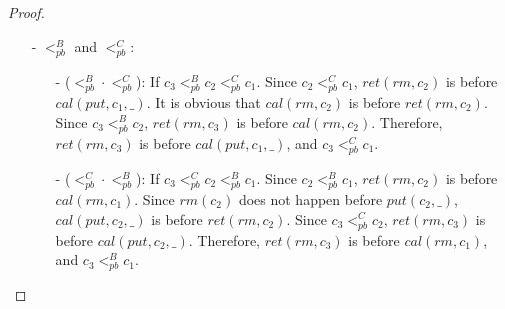 \begin {proof}
\begin{itemize}
\begin{itemize}
    \item[-] ($<_{\textit{pb}}^C \cdot <_{\textit{pb}}^A$): If $c_3 <_{\textit{pb}}^C c_2 <_{\textit{pb}}^A c_1$. Since $c_2 <_{\textit{pb}}^A c_1$, $\textit{ret}(\textit{put},c_2)$ is before $\textit{cal}(\textit{put},c_1,\_)$. It is obvious that $\textit{cal}(\textit{put},c_2,\_)$ is before $\textit{ret}(\textit{put},c_2)$. Since $c_3 <_{\textit{pb}}^C c_2$, $\textit{ret}(\textit{rm},c_3)$ is before $\textit{cal}(\textit{put},c_2,\_)$. Therefore, $\textit{ret}(\textit{rm},c_3)$ is before $\textit{cal}(\textit{put},c_1,\_)$, and $c_3 <_{\textit{pb}}^C c_1$.

    \end{itemize}

\item[-] $<_{\textit{pb}}^B$ and $<_{\textit{pb}}^C$:

    \begin{itemize}
    \setlength{\itemsep}{0.5pt}
    \item[-] ($<_{\textit{pb}}^B \cdot <_{\textit{pb}}^C$): If $c_3 <_{\textit{pb}}^B c_2 <_{\textit{pb}}^C c_1$. Since $c_2 <_{\textit{pb}}^C c_1$, $\textit{ret}(\textit{rm},c_2)$ is before $\textit{cal}(\textit{put},c_1,\_)$. It is obvious that $\textit{cal}(\textit{rm},c_2)$ is before $\textit{ret}(\textit{rm},c_2)$. Since $c_3 <_{\textit{pb}}^B c_2$, $\textit{ret}(\textit{rm},c_3)$ is before $\textit{cal}(\textit{rm},c_2)$. Therefore, $\textit{ret}(\textit{rm},c_3)$ is before $\textit{cal}(\textit{put},c_1,\_)$, and $c_3 <_{\textit{pb}}^C c_1$.

    \item[-] ($<_{\textit{pb}}^C \cdot <_{\textit{pb}}^B$): If $c_3 <_{\textit{pb}}^C c_2 <_{\textit{pb}}^B c_1$. Since $c_2 <_{\textit{pb}}^B c_1$, $\textit{ret}(\textit{rm},c_2)$ is before $\textit{cal}(\textit{rm},c_1)$. Since $\textit{rm}(c_2)$ does not happen before $\textit{put}(c_2,\_)$, $\textit{cal}(\textit{put},c_2,\_)$ is before $\textit{ret}(\textit{rm},c_2)$. Since $c_3 <_{\textit{pb}}^C c_2$, $\textit{ret}(\textit{rm},c_3)$ is before $\textit{cal}(\textit{put},c_2,\_)$. Therefore, $\textit{ret}(\textit{rm},c_3)$ is before $\textit{cal}(\textit{rm},c_1)$, and $c_3 <_{\textit{pb}}^B c_1$.
    \end{itemize}


\end{itemize}
\end{proof}
